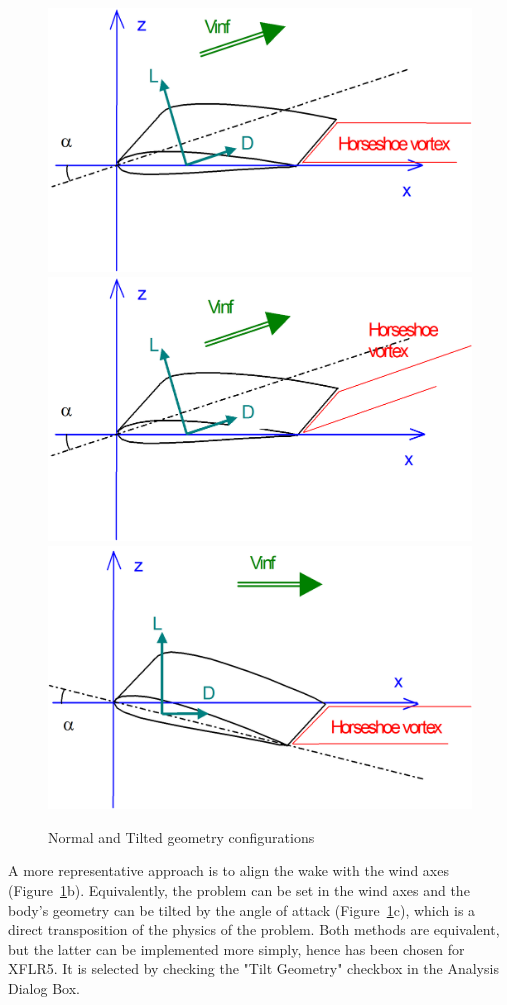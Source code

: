 \documentclass[a4paper,twoside,12pt,dvips]{article}
\begin{document}
\begin{figure}[htbp]
  \includegraphics[width=0.8\linewidth]{img-29}\centering\\
  \includegraphics[width=0.8\linewidth]{img-30}\centering\\
  \includegraphics[width=0.8\linewidth]{img-31}\centering
  \caption{Normal and Tilted geometry configurations}
  \label{fig:normal_and_tilted_geometry_configurations}
\end{figure}


A more representative approach is to align the wake with the wind axes
(Figure~\ref{fig:normal_and_tilted_geometry_configurations}b). Equivalently,
the problem can be set in the wind axes and the body's geometry can be
tilted by the angle of attack
(Figure~\ref{fig:normal_and_tilted_geometry_configurations}c), which
is a direct transposition of the physics of the problem.  Both methods
are equivalent, but the latter can be implemented more simply, hence
has been chosen for XFLR5. It is selected by checking the "Tilt
Geometry" checkbox in the Analysis Dialog Box.
\end{document}
